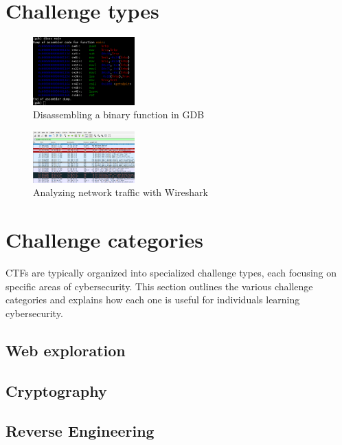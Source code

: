 \documentclass[conference]{IEEEtran}
\begin{document}
\section{Challenge types}
\label{sec-challenge-types}

\begin{figure}[htbp]
	\centering
	\includegraphics[width=0.35\textwidth]{fig/gdb.png}
	\caption{Disassembling a binary function in GDB}
	\label{fig-gdb}
\end{figure}

\begin{figure}[htbp]
	\centering
	\includegraphics[width=0.35\textwidth]{fig/wireshark.png}
	\caption{Analyzing network traffic with Wireshark}
	\label{fig-gdb}
\end{figure}

\section{Challenge categories}

CTFs are typically organized into specialized challenge types, each focusing on
specific areas of cybersecurity. This section outlines the various challenge
categories and explains how each one is useful for individuals learning
cybersecurity.

\subsection{Web exploration}

\subsection{Cryptography}

\subsection{Reverse Engineering}
\end{document}
